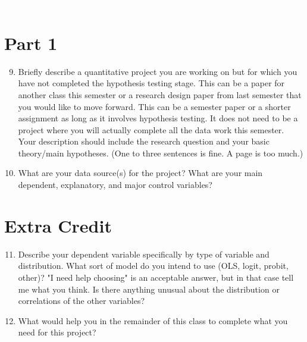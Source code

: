 \documentclass[12pt]{article}
\begin{document}
	
	

	
	{\textcolor{white}.}
	

	
	\section*{Part 1}
	
	\begin{enumerate}[label=\arabic*]
	 \setcounter{enumi}{8}
	\item Briefly describe a quantitative project you are working on but for which you have not completed the hypothesis testing stage. This can be a paper for another class this semester or a research design paper from last semester that you would like to move forward. This can be a semester paper or a shorter assignment as long as it involves hypothesis testing. It does not need to be a project where you will actually complete all the data work this semester. Your description should include the research question and your basic theory/main hypotheses. (One to three sentences is fine. A page is too much.)
	
	\item What are your data source(s) for the project? What are your main dependent, explanatory, and major control variables?
		
	\end{enumerate}
	
\section*{Extra Credit}
	\begin{enumerate}[label=\arabic*]
		 \setcounter{enumi}{10}
		 
	\item Describe your dependent variable specifically by type of variable and distribution. What sort of model do you intend to use (OLS, logit, probit, other)? "I need help choosing" is an acceptable answer, but in that case tell me what you think. Is there anything unusual about the distribution or correlations of the other variables?
	
	\item What would help you in the remainder of this class to complete what you need for this project?
	
	\end{enumerate}
	
\end{document}
